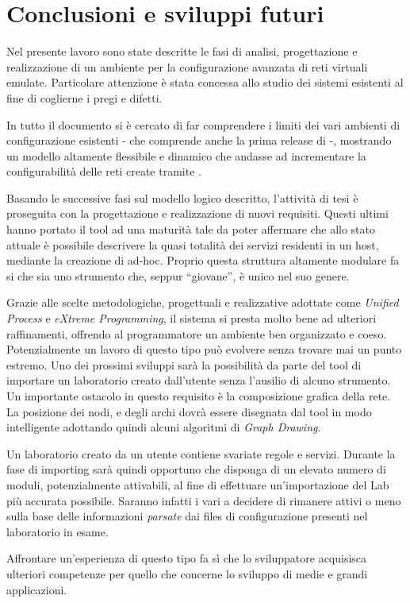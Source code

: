 \chapter*{Conclusioni e sviluppi futuri}

Nel presente lavoro sono state descritte le fasi di analisi, progettazione e realizzazione di un ambiente per la configurazione avanzata di reti virtuali emulate. Particolare attenzione è stata concessa allo studio dei sistemi esistenti al fine di coglierne i pregi e difetti.

In tutto il documento si è cercato di far comprendere i limiti dei vari ambienti di configurazione esistenti - che comprende anche la prima release di \visualnetkit{} -, mostrando un modello altamente flessibile e dinamico che andasse ad incrementare la configurabilità delle reti create tramite \visualnetkit{}.

Basando le successive fasi sul modello logico descritto, l'attività di tesi è proseguita con la progettazione e realizzazione di nuovi requisiti. Questi ultimi hanno portato il tool ad una maturità tale da poter affermare che allo stato attuale è possibile descrivere la quasi totalità dei servizi residenti in un host, mediante la creazione di \plugin{} ad-hoc. Proprio questa struttura altamente modulare fa si che \visualnetkit{} sia uno strumento che, seppur ``giovane'', è unico nel suo genere.

Grazie alle scelte metodologiche, progettuali e realizzative adottate come \emph{Unified Process} e \emph{eXtreme Programming}, il sistema si presta molto bene ad ulteriori raffinamenti, offrendo al programmatore un ambiente ben organizzato e coeso. Potenzialmente un lavoro di questo tipo può evolvere senza trovare mai un punto estremo. Uno dei prossimi sviluppi sarà la possibilità da parte del tool di importare un laboratorio creato dall'utente senza l'ausilio di alcuno strumento.
Un importante ostacolo in questo requisito è la composizione grafica della rete. La posizione dei nodi, e degli archi dovrà essere disegnata dal tool in modo intelligente adottando quindi alcuni algoritmi di \emph{Graph Drawing}.

Un laboratorio creato da un utente contiene svariate regole e servizi. Durante la fase di importing sarà quindi opportuno che \visualnetkit{} disponga di un elevato numero di moduli, potenzialmente attivabili, al fine di effettuare un'importazione del Lab più accurata possibile. Saranno infatti i vari \plugin{} a decidere di rimanere attivi o meno sulla base delle informazioni \emph{parsate} dai files di configurazione presenti nel laboratorio in esame.

Affrontare un'esperienza di questo tipo fa sì che lo sviluppatore acquisisca ulteriori competenze per quello che concerne lo sviluppo di medie e grandi applicazioni.